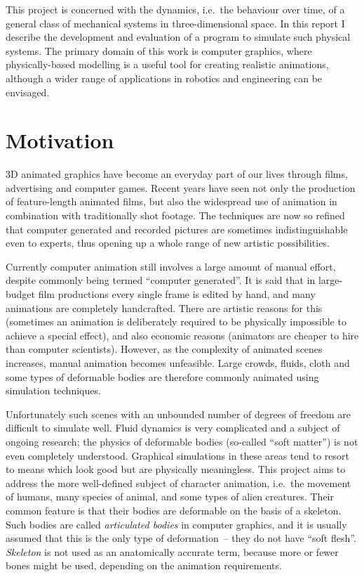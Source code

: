 This project is concerned with the dynamics, i.e.\ the behaviour over time, of a general class
of mechanical systems in three-dimensional space. In this report I describe the development and
evaluation of a program to simulate such physical systems. The primary domain of this work is
computer graphics, where physically-based modelling is a useful tool for creating realistic
animations, although a wider range of applications in robotics and engineering can be envisaged.

\section{Motivation}

3D animated graphics have become an everyday part of our lives through films, advertising and
computer games. Recent years have seen not only the production of feature-length animated films,
but also the widespread use of animation in combination with traditionally shot footage. The
techniques are now so refined that computer generated and recorded pictures are sometimes
indistinguishable even to experts, thus opening up a whole range of new artistic possibilities.

Currently computer animation still involves a large amount of manual effort, despite commonly
being termed ``computer generated''. It is said that in large-budget film productions every single
frame is edited by hand, and many animations are completely handcrafted. There are artistic
reasons for this (sometimes an animation is deliberately required to be physically impossible
to achieve a special effect), and also economic reasons (animators are cheaper to hire than
computer scientists). However, as the complexity of animated scenes increases, manual animation
becomes unfeasible. Large crowds, fluids, cloth and some types of deformable bodies are therefore
commonly animated using simulation techniques.

Unfortunately such scenes with an unbounded number of degrees of freedom are difficult to simulate
well. Fluid dynamics is very complicated and a subject of ongoing research; the physics of
deformable bodies (so-called ``soft matter'') is not even completely understood. Graphical
simulations in these areas tend to resort to means which look good but are physically meaningless.
This project aims to address the more well-defined subject of character animation, i.e.\ the
movement of humans, many species of animal, and some types of alien creatures. Their common
feature is that their bodies are deformable on the basis of a skeleton. Such bodies are called
\emph{articulated bodies} in computer graphics, and it is usually assumed that this is the only
type of deformation~-- they do not have ``soft flesh''. \textsl{Skeleton} is not used as an
anatomically accurate term, because more or fewer bones might be used, depending on the animation
requirements.

